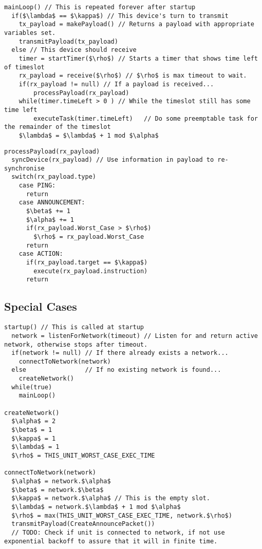 \begin{lstlisting}[style=customc,mathescape=true,caption={Pseudocode example of the main loop}]  
mainLoop() // This is repeated forever after startup
  if($\lambda$ == $\kappa$) // This device's turn to transmit
  	tx_payload = makePayload() // Returns a payload with appropriate variables set.
  	transmitPayload(tx_payload)
  else // This device should receive
  	timer = startTimer($\rho$) // Starts a timer that shows time left of timeslot
  	rx_payload = receive($\rho$) // $\rho$ is max timeout to wait. 
  	if(rx_payload != null) // If a payload is received...
  	    processPayload(rx_payload)
  	while(timer.timeLeft > 0 ) // While the timeslot still has some time left
  	    executeTask(timer.timeLeft)   // Do some preemptable task for the remainder of the timeslot
  	$\lambda$ = $\lambda$ + 1 mod $\alpha$   
\end{lstlisting}  

\begin{lstlisting}[style=customc,mathescape=true,caption={Pseudocode example of the method that processes the payload}]  
processPayload(rx_payload)
  syncDevice(rx_payload) // Use information in payload to re-synchronise
  switch(rx_payload.type)
    case PING:
      return
    case ANNOUNCEMENT:
      $\beta$ += 1
      $\alpha$ += 1
      if(rx_payload.Worst_Case > $\rho$)
        $\rho$ = rx_payload.Worst_Case
      return
    case ACTION:
      if(rx_payload.target == $\kappa$)
        execute(rx_payload.instruction)
      return         
\end{lstlisting}

\subsection{Special Cases} %
\label{sub:special_cases} 


\begin{lstlisting}[style=customc,mathescape=true,caption={Pseudocode example of special case functions}]
startup() // This is called at startup                                           
  network = listenForNetwork(timeout) // Listen for and return active network, otherwise stops after timeout.
  if(network != null) // If there already exists a network...
    connectToNetwork(network)
  else                // If no existing network is found...
    createNetwork()
  while(true)
    mainLoop()
  
createNetwork()
  $\alpha$ = 2
  $\beta$ = 1
  $\kappa$ = 1
  $\lambda$ = 1
  $\rho$ = THIS_UNIT_WORST_CASE_EXEC_TIME
  
connectToNetwork(network)
  $\alpha$ = network.$\alpha$
  $\beta$ = network.$\beta$
  $\kappa$ = network.$\alpha$ // This is the empty slot.
  $\lambda$ = network.$\lambda$ + 1 mod $\alpha$
  $\rho$ = max(THIS_UNIT_WORST_CASE_EXEC_TIME, network.$\rho$)
  transmitPayload(CreateAnnouncePacket())
  // TODO: Check if unit is connected to network, if not use exponential backoff to assure that it will in finite time.
\end{lstlisting}   
